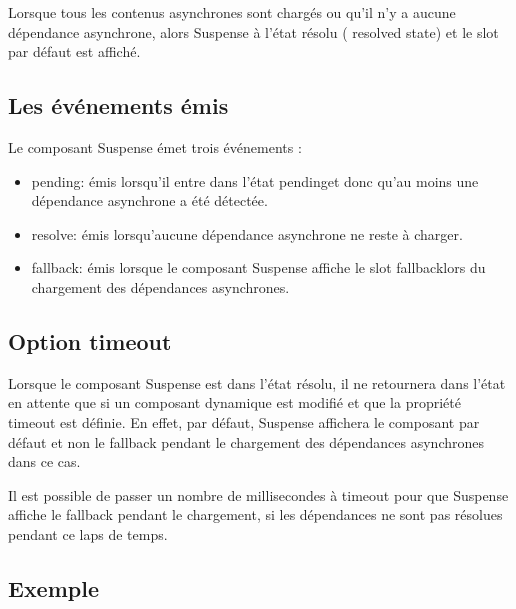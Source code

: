 Lorsque tous les contenus asynchrones sont chargés ou qu'il n'y a aucune dépendance asynchrone, alors {\color{monOrange} Suspense} à l'état résolu ( {\color{monOrange}resolved state}) et le {\color{monOrange}slot} par défaut est affiché.

\subsection{Les événements émis}
Le composant {\color{monOrange}Suspense} émet trois événements :
\begin{itemize}
\item {\color{monOrange}pending:} émis lorsqu'il entre dans l'état pendinget donc qu'au moins une dépendance asynchrone a été détectée.
\item {\color{monOrange}resolve:} émis lorsqu'aucune dépendance asynchrone ne reste à charger.
\item {\color{monOrange}fallback:} émis lorsque le composant Suspense affiche le {\color{monOrange}slot fallbacklors} du chargement des dépendances asynchrones.

\end{itemize}
\subsection{Option {\color{monOrange}timeout}}
Lorsque le composant {\color{monOrange}Suspense} est dans l'état résolu, il ne retournera dans l'état en attente que si un composant dynamique est modifié et que la propriété {\color{monOrange}timeout} est définie. En effet, par défaut, {\color{monOrange}Suspense} affichera le composant par défaut et non le {\color{monOrange}fallback} pendant le chargement des dépendances asynchrones dans ce cas.

Il est possible de passer un nombre de millisecondes à {\color{monOrange}timeout} pour que {\color{monOrange}Suspense} affiche le {\color{monOrange}fallback} pendant le chargement, si les dépendances ne sont pas résolues pendant ce laps de temps.
\subsection{Exemple}

